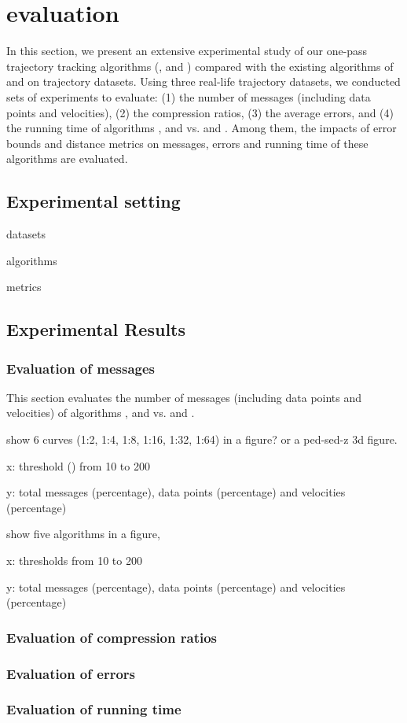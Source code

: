 \section{evaluation}
\label{sec-exp}

In this section, we present an extensive experimental study of our one-pass trajectory tracking algorithms (\citt, \sitt and \bitt) compared with the
existing algorithms of \ldrh and \grts on trajectory datasets. Using three real-life trajectory datasets, we conducted sets of experiments to evaluate:
(1) the number of messages (including data points and velocities),
(2) the compression ratios,
(3) the average errors, and
(4) the running time of algorithms \citt, \sitt and \bitt vs. \ldrh and \grts. 
Among them, the impacts of error bounds and distance metrics on messages, errors and running time of these algorithms are evaluated. 

\subsection{Experimental setting}

datasets

algorithms

metrics


\subsection{Experimental Results}

\subsubsection{Evaluation of messages}
This section evaluates the number of messages (including data points and velocities) of algorithms \citt, \sitt and \bitt vs. \ldrh and \grts.


show 6 curves (1:2, 1:4, 1:8, 1:16, 1:32, 1:64) in a figure? or a ped-sed-z 3d figure.

x: threshold (\ped) from 10 to 200

y: total messages (percentage), data points (percentage) and velocities (percentage)



show five algorithms in a figure, 

x: thresholds from 10 to 200

y: total messages (percentage), data points (percentage) and velocities (percentage)


\subsubsection{Evaluation of compression ratios}

\subsubsection{Evaluation of errors}

\subsubsection{Evaluation of running time}